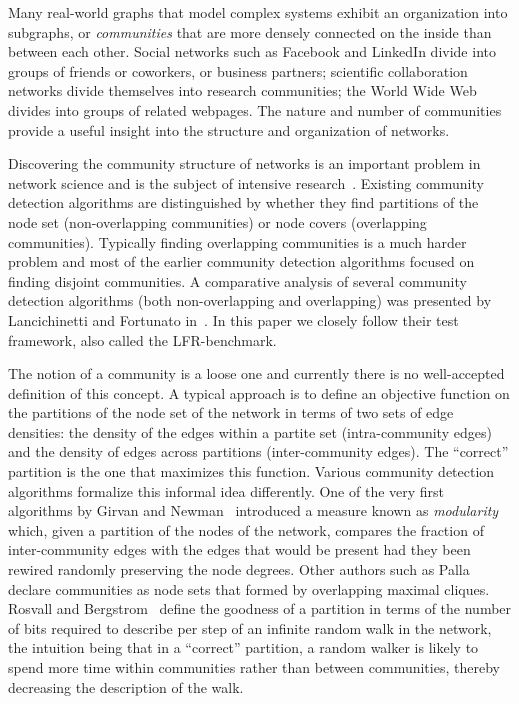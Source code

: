 Many real-world graphs that model complex systems exhibit an organization 
into subgraphs, or \textit{communities} that are more densely connected on the inside than between each other. 
Social networks such as Facebook and LinkedIn divide into groups of friends 
or coworkers, or business partners; scientific collaboration networks divide 
themselves into research communities; the World Wide Web divides into groups 
of related webpages. The nature and number of communities provide 
a useful insight into the structure and organization of networks. 

Discovering the community structure of networks is an 
important problem in network science and is the subject 
of intensive research~\cite{GN02,GN04,CNM04,RCC04,DM04,PDFV05,NL07,BGLL08,RB08,RN09}. 
Existing community detection algorithms are 
distinguished by whether they find partitions of the node set 
(non-overlapping communities) or node covers (overlapping communities). 
Typically finding overlapping communities is a much harder problem and most of the 
earlier community detection algorithms focused on finding disjoint 
communities. A comparative analysis of several community detection algorithms 
(both non-overlapping and overlapping) was presented by Lancichinetti and Fortunato 
in~\cite{LF09}. In this paper we closely follow their test framework, 
also called the LFR-benchmark.

The notion of a community is a loose one and currently there is no 
well-accepted definition of this concept. A typical approach is to define an 
objective function on the partitions of the node set of the network 
in terms of two sets of edge densities: the density of the 
edges within a partite set (intra-community edges) and the density of edges across partitions 
(inter-community edges). The ``correct'' partition is the one that maximizes this 
function. Various community detection algorithms formalize this
informal idea differently. One of the very first algorithms by
Girvan and Newman~\cite{GN02} introduced a measure known as \textit{modularity}
which, given a partition of the nodes of the network, compares the fraction of 
inter-community edges with the edges that would be present had they been 
rewired randomly preserving the node degrees. Other authors such as Palla 
\etal~\cite{PDFV05} declare communities as node sets that formed 
by overlapping maximal cliques. Rosvall and Bergstrom~\cite{RB08} 
define the goodness of a partition in terms of the number of bits required to 
describe per step of an infinite random walk in the network, the intuition being 
that in a ``correct'' partition, a random walker is likely to spend more time 
within communities rather than between communities, thereby decreasing the 
description of the walk.  

